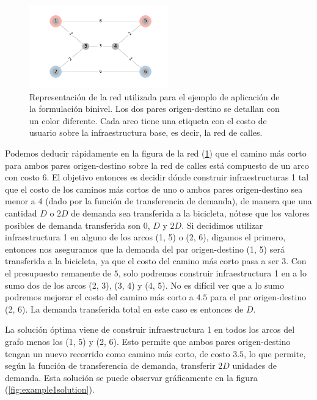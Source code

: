 \documentclass{article}
\begin{document}
  \begin{figure}[h!]
    \centering
    \includegraphics[width=6cm]{../resources/example_1_base.png}
    \caption{Representación de la red utilizada para el ejemplo de aplicación de la formulación binivel. Los dos pares origen-destino se detallan con un color diferente. Cada arco tiene una etiqueta con el costo de usuario sobre la infraestructura base, es decir, la red de calles.}
    \label{fig:example1base}
  \end{figure}

  Podemos deducir rápidamente en la figura de la red (\ref{fig:example1base}) que el camino más corto para ambos pares origen-destino sobre la red de calles está compuesto de un arco con costo 6. El objetivo entonces es decidir dónde construir infraestructuras 1 tal que el costo de los caminos más cortos de uno o ambos pares origen-destino sea menor a 4 (dado por la función de transferencia de demanda), de manera que una cantidad $D$ o $2D$ de demanda sea transferida a la bicicleta, nótese que los valores posibles de demanda transferida son $0$, $D$ y $2D$. Si decidimos utilizar infraestructura 1 en alguno de los arcos (1, 5) o (2, 6), digamos el primero, entonces nos aseguramos que la demanda del par origen-destino (1, 5) será transferida a la bicicleta, ya que el costo del camino más corto pasa a ser $3$. Con el presupuesto remanente de $5$, solo podremos construir infraestructura 1 en a lo sumo dos de los arcos (2, 3), (3, 4) y (4, 5). No es difícil ver que a lo sumo podremos mejorar el costo del camino más corto a $4.5$ para el par origen-destino (2, 6). La demanda transferida total en este caso es entonces de $D$.

  La solución óptima viene de construir infraestructura 1 en todos los arcos del grafo menos los (1, 5) y (2, 6). Esto permite que ambos pares origen-destino tengan un nuevo recorrido como camino más corto, de costo $3.5$, lo que permite, según la función de transferencia de demanda, transferir $2D$ unidades de demanda. Esta solución se puede observar gráficamente en la figura (\ref{fig:example1solution}).
\end{document}
